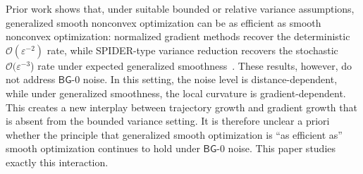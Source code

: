 \documentclass[letter,11pt]{article}
\newcommand{\Ocal}{\mathcal{O}}
\begin{document}
Prior work shows that, under suitable bounded or relative variance assumptions, generalized smooth nonconvex optimization can be as efficient as smooth nonconvex optimization: normalized gradient methods recover the
deterministic $\Ocal(\varepsilon^{-2})$ rate, while SPIDER-type variance reduction recovers the stochastic $\Ocal(\varepsilon^{-3}$) rate under expected generalized smoothness~\cite{chen2023generalized,fang2018spider}. These results, however, do not address $\mathsf{BG}$-0 noise. In this setting, the noise level is distance-dependent, while under generalized smoothness, the local curvature is gradient-dependent. This creates a new interplay between trajectory growth and gradient growth that is absent from the bounded variance setting. It is therefore unclear a priori whether the principle that generalized smooth optimization is ``as efficient as'' smooth optimization continues to hold under $\mathsf{BG}$-0 noise. This paper studies exactly this interaction.
\end{document}
